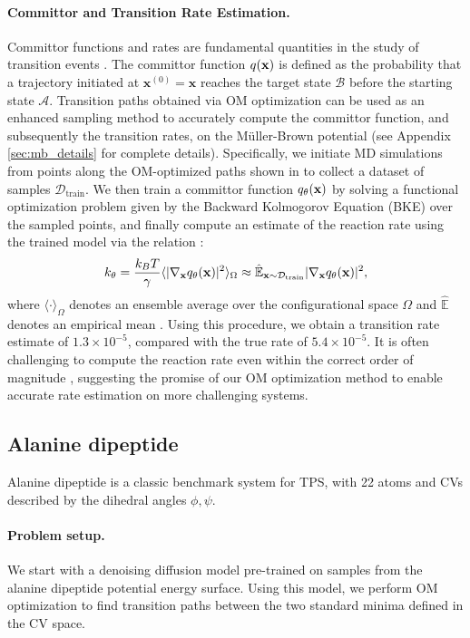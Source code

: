 \paragraph{Committor and Transition Rate Estimation.} Committor functions and rates are fundamental quantities in the study of transition events \cite{vanden2006towards}. The committor function $q(\mathbf{x})$ is defined as the probability that a trajectory initiated at $\mathbf{x}^{(0)} = \mathbf{x}$ reaches the target state $\mathcal{B}$ before the starting state $\mathcal{A}$. Transition paths obtained via OM optimization can be used as an enhanced sampling method to accurately compute the committor function, and subsequently the transition rates, on the Müller-Brown potential (see Appendix \ref{sec:mb_details} for complete details). Specifically, we initiate MD simulations from points along the OM-optimized paths shown in  to collect a dataset of samples $\mathcal{D}_\text{train}$. We then train a committor function $q_\theta(\mathbf{x})$ by solving a functional optimization problem given by the Backward Kolmogorov Equation (BKE) over the sampled points, and finally compute an estimate of the reaction rate using the trained model via the relation \cite{vanden2006towards}:
\begin{equation}
\label{eq:final_rate}
    k_\theta = \frac{k_BT}{\gamma}\langle |\nabla_{\mathbf{x}} q_\theta(\mathbf{x})|^2 \rangle_\Omega \approx \hat{\mathbb{E}}_{\mathbf{x} \sim \mathcal{D}_\text{train}} |\nabla_{\mathbf{x}} q_\theta(\mathbf{x})|^2,
\end{equation}
where $\langle \cdot \rangle_\Omega$ denotes an ensemble average over the configurational space $\Omega$ and $\hat{\mathbb{E}}$ denotes an empirical mean . Using this procedure, we obtain a transition rate estimate of $1.3 \times 10^{-5}$, compared with the true rate of $5.4 \times 10^{-5}$. It is often challenging to compute the reaction rate even within the correct order of magnitude \cite{rotskoff2022active, hasyim2022supervised}, suggesting the promise of our OM optimization method to enable accurate rate estimation on more challenging systems.
\vspace{-5pt}
\subsection{Alanine dipeptide}
\label{sec:alanine_dipeptide_results}
Alanine dipeptide is a classic benchmark system for TPS, with 22 atoms and CVs described by the dihedral angles $\phi, \psi$. 
\vspace{-5pt}
\paragraph{Problem setup.} We start with a denoising diffusion model pre-trained on samples from the alanine dipeptide potential energy surface. Using this model, we perform OM optimization to find transition paths between the two standard minima defined in the CV space. 
\vspace{-10pt}
